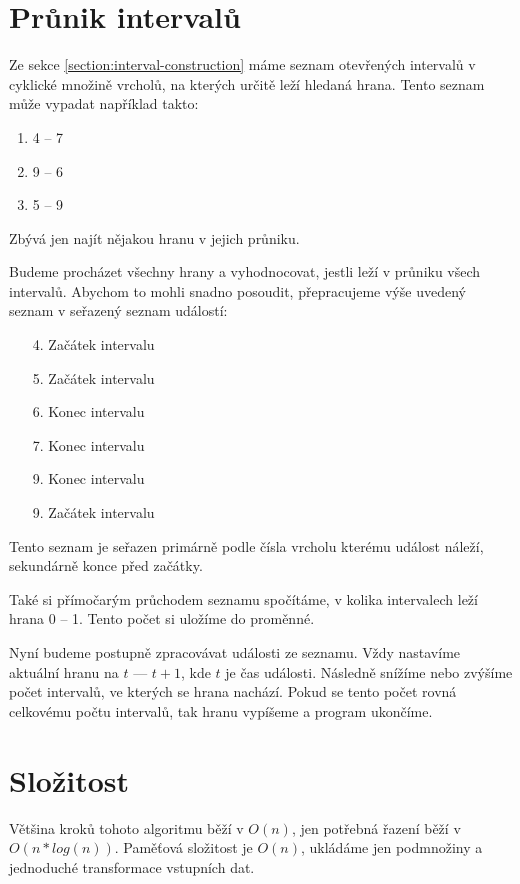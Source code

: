 \documentclass{article}
\begin{document}
\section{Průnik intervalů}

Ze sekce \ref{section:interval-construction} máme seznam otevřených intervalů v cyklické množině vrcholů, na kterých určitě leží hledaná hrana. Tento seznam může vypadat například takto:

\begin{enumerate}
    \item 4 -- 7
    \item 9 -- 6
    \item 5 -- 9
\end{enumerate}

Zbývá jen najít nějakou hranu v jejich průniku.

Budeme procházet všechny hrany a vyhodnocovat, jestli leží v průniku všech intervalů. Abychom to mohli snadno posoudit, přepracujeme výše uvedený seznam v seřazený seznam událostí:

\begin{enumerate}
    \item[4.] Začátek intervalu
    \item[5.] Začátek intervalu
    \item[6.] Konec intervalu
    \item[7.] Konec intervalu
    \item[9.] Konec intervalu
    \item[9.] Začátek intervalu
\end{enumerate}

Tento seznam je seřazen primárně podle čísla vrcholu kterému událost náleží, sekundárně konce před začátky.

Také si přímočarým průchodem seznamu spočítáme, v kolika intervalech leží hrana 0 -- 1. Tento počet si uložíme do proměnné.

Nyní budeme postupně zpracovávat události ze seznamu. Vždy nastavíme aktuální hranu na \(t\) --- \(t+1\), kde \(t\) je čas události. Následně snížíme nebo zvýšíme počet intervalů, ve kterých se hrana nachází. Pokud se tento počet rovná celkovému počtu intervalů, tak hranu vypíšeme a program ukončíme.

\section{Složitost}

Většina kroků tohoto algoritmu běží v \(O(n)\), jen potřebná řazení běží v \(O(n * log(n))\). Paměťová složitost je \(O(n)\), ukládáme jen podmnožiny a jednoduché transformace vstupních dat.
\end{document}
